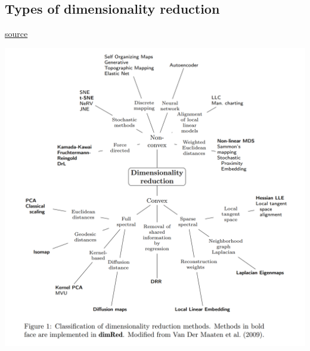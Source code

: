 \documentclass[
]{article}
\begin{document}
\hypertarget{types-of-dimensionality-reduction}{%
\subsection{Types of dimensionality
reduction}\label{types-of-dimensionality-reduction}}

\href{https://cran.r-project.org/web/packages/dimRed/vignettes/dimensionality-reduction.pdf}{source}

\includegraphics{pics/dim_red.png}
\end{document}
